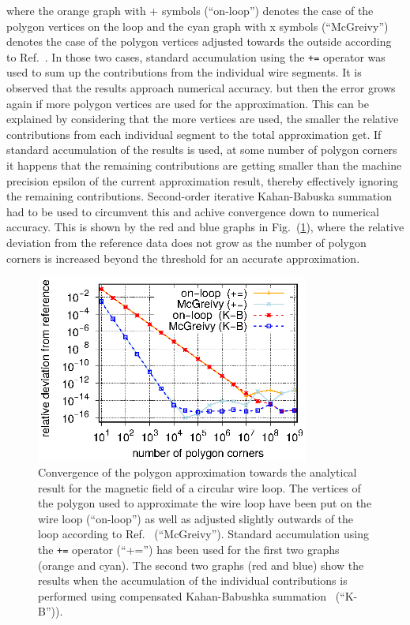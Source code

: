 where the orange graph with + symbols (``on-loop'') denotes the case of the polygon vertices on the loop
and the cyan graph with x symbols (``McGreivy'') denotes the case of the polygon vertices adjusted towards the outside
according to Ref.~\cite{mcgreivy_2021}.
In those two cases, standard accumulation using the \texttt{+=} operator
was used to sum up the contributions from the individual wire segments.
It is observed that the results approach numerical accuracy.
but then the error grows again if more polygon vertices are used for the approximation.
This can be explained by considering that the more vertices are used,
the smaller the relative contributions from each individual segment to the total approximation get.
If standard accumulation of the results is used, at some number of polygon corners
it happens that the remaining contributions are getting smaller than the machine precision epsilon
of the current approximation result, thereby effectively ignoring the remaining contributions.
Second-order iterative Kahan-Babuska summation~\cite{klein_2006} had to be used
to circumvent this and achive convergence down to numerical accuracy.
This is shown by the red and blue graphs in Fig.~(\ref{fig:McGreivy_convergence_2}),
where the relative deviation from the reference data does not grow
as the number of polygon corners is increased beyond the threshold for an accurate approximation.
\begin{figure}[htbp]
 \centering
 \includegraphics[width=0.8\textwidth]{img/McGreivy_convergence_2.eps}
 \caption{Convergence of the polygon approximation towards the analytical result for the magnetic field of a circular wire loop.
          The vertices of the polygon used to approximate the wire loop have been put on the wire loop (``on-loop'')
          as well as adjusted slightly outwards of the loop according to Ref.~\cite{mcgreivy_2021} (``McGreivy'').
          Standard accumulation using the \texttt{+=} operator (``+='') has been used for the first two graphs (orange and cyan).
          The second two graphs (red and blue) show the results when the accumulation of the individual contributions
          is performed using compensated Kahan-Babushka summation~\cite{klein_2006} (``K-B'')).}
 \label{fig:McGreivy_convergence_2}
\end{figure}
